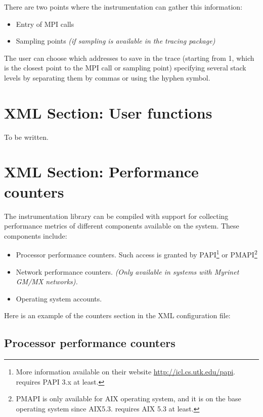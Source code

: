 There are two points where the instrumentation can gather this information:

\begin{itemize}
 \item Entry of MPI calls
 \item Sampling points {\em (if sampling is available in the tracing package)}
\end{itemize}

The user can choose which addresses to save in the trace (starting from 1, which is the closest point to the MPI call or sampling point) specifying several stack levels by separating them by commas or using the hyphen symbol.

\section{XML Section: User functions}\label{sec:XMLSectionUF}

To be written.

\section{XML Section: Performance counters}\label{sec:XMLSectionPerformanceCounters}

The instrumentation library can be compiled with support for collecting performance metrics of different components available on the system. These components include:

\begin{itemize}
 \item Processor performance counters. Such access is granted by PAPI\footnote{More information available on their website \url{http://icl.cs.utk.edu/papi}. \TRACE requires PAPI 3.x at least.} or PMAPI\footnote{PMAPI is only available for AIX operating system, and it is on the base operating system since AIX5.3. \TRACE requires AIX 5.3 at least.}
 \item Network performance counters. {\em (Only available in systems with Myrinet GM/MX networks).}
 \item Operating system accounts.
\end{itemize}

Here is an example of the counters section in the XML configuration file:



\subsection{Processor performance counters}\label{subsec:ProcessorPerformanceCounters}

